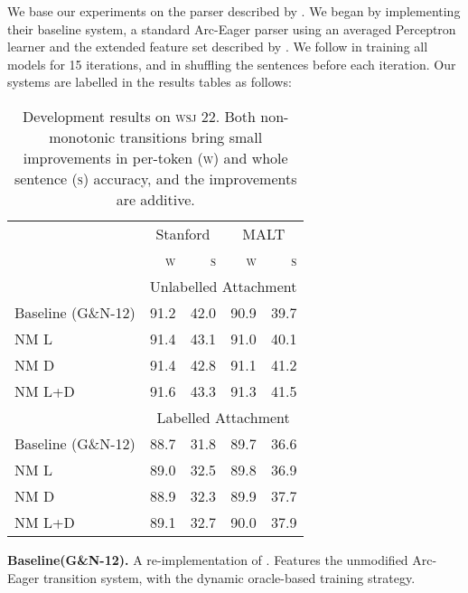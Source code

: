 \documentclass[11pt,letterpaper]{article}
\newcommand{\wsj}{\textsc{wsj}\xspace}
\begin{document}
We base our experiments on the parser described by \citet{goldberg:12}. We
began by implementing their baseline system, a standard Arc-Eager parser using
an averaged Perceptron learner and the extended feature set described by \citet{zhang:11}.
We follow \citet{goldberg:12} in training all models for 15 iterations,
and in shuffling the sentences before each iteration.
Our systems are labelled in the results tables as follows:

\begin{table}[t]
    \small
    \centering
    \begin{tabular}{l|rrrr}
        \hline
        & \multicolumn{2}{c}{Stanford} & \multicolumn{2}{c}{MALT}  \\
        & \textsc{w}  & \textsc{s} & \textsc{w} & \textsc{s} \\
        \hline \hline
        & \multicolumn{4}{c}{Unlabelled Attachment} \\
        \hline
        Baseline (G\&N-12) & 91.2 & 42.0 & 90.9 & 39.7 \\
        NM L & 91.4 & 43.1 & 91.0 & 40.1 \\
        NM D & 91.4 & 42.8 & 91.1 & 41.2 \\
        NM L+D & 91.6 & 43.3 & 91.3 & 41.5 \\
        \hline
        & \multicolumn{4}{c}{Labelled Attachment} \\
        \hline
        Baseline (G\&N-12)& 88.7 & 31.8 & 89.7 & 36.6 \\
        NM L & 89.0 & 32.5 & 89.8 & 36.9 \\
        NM D & 88.9 & 32.3 & 89.9 & 37.7 \\
        NM L+D & 89.1 & 32.7 & 90.0 & 37.9 \\
        \hline
    \end{tabular}
    \caption{\small
        Development results on \wsj 22. Both non-monotonic transitions
        bring small improvements in per-token (\textsc{w}) and whole sentence (\textsc{s})
        accuracy, and the improvements are additive.
        \label{tab:goldberg}}
\end{table}


\textbf{Baseline(G\&N-12).}
A re-implementation of \citep{goldberg:12}. Features the unmodified Arc-Eager transition
system, with the dynamic oracle-based training strategy.
\end{document}
